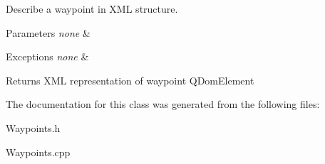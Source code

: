 Describe a waypoint in X\-M\-L structure. 


\begin{DoxyParams}{Parameters}
{\em none} & \\
\hline
\end{DoxyParams}

\begin{DoxyExceptions}{Exceptions}
{\em none} & \\
\hline
\end{DoxyExceptions}
\begin{DoxyReturn}{Returns}
X\-M\-L representation of waypoint Q\-Dom\-Element 
\end{DoxyReturn}


The documentation for this class was generated from the following files\-:\begin{DoxyCompactItemize}
\item 
Waypoints.\-h\item 
Waypoints.\-cpp\end{DoxyCompactItemize}
